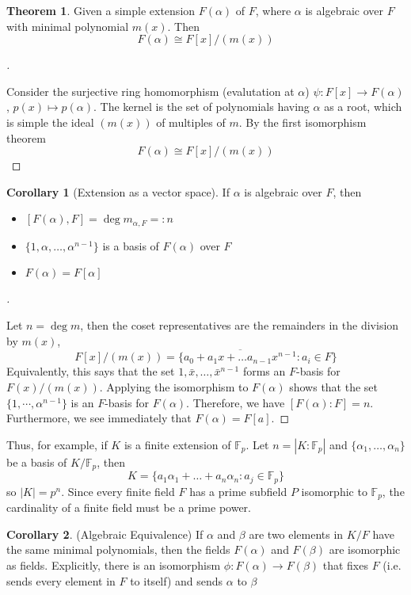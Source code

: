 \documentclass[12pt]{article}
\theoremstyle{definition}
\newtheorem{thm}{Theorem}
\newtheorem{cor}{Corollary}
\newenvironment{proofs}[1][\proofname]{%
  \begin{proof}[#1]$ $\par\nobreak\ignorespaces
}{%
  \end{proof}
}
\newcommand{\FF}{\mathbb F}
\begin{document}
\begin{thm}
	Given a simple extension $F(\alpha)$ of $F$, where $\alpha$ is algebraic over $F$ with minimal polynomial $m(x)$. Then
	\[F(\alpha)\cong F[x]/(m(x))\]
\end{thm}

\begin{proofs}
	Consider the surjective ring homomorphism (evalutation at $\alpha$) $\psi: F[x]\to F(\alpha)$, $p(x)\mapsto p(\alpha)$. The kernel is the set of polynomials having $\alpha$ as a root, which is simple the ideal $(m(x))$ of multiples of $m$. By the first isomorphism theorem
	\[F(\alpha)\cong F[x]/(m(x))\]
\end{proofs}

\begin{cor}[Extension as a vector space]
	If $\alpha$ is algebraic over $F$, then
	\begin{itemize}
		\item $[F(\alpha),F]=\deg m_{\alpha,F}=:n$
		\item $\{1,\alpha,\dots, \alpha^{n-1}\}$ is a basis of $F(\alpha)$ over $F$
		\item $F(\alpha)=F[\alpha]$
	\end{itemize}
\end{cor}

\begin{proofs}
	Let $n=\deg m$, then the coset representatives are the remainders in the division by $m(x)$,
	\[F[x]/(m(x))=\{\overline{a_0+a_1x+\dots a_{n-1}x^{n-1}}: a_i \in F\}\]
	Equivalently, this says that the set ${1,\bar{x},\dots,\bar{x}^{n-1}}$ forms an $F$-basis for $F(x)/(m(x))$. Applying the isomorphism to $F(\alpha)$ shows that the set $\{1,\cdots,\alpha^{n-1}\}$ is an $F$-basis for $F(\alpha)$. Therefore, we have $[F(\alpha):F]=n$. Furthermore, we see immediately that $F(\alpha)=F[a]$.
\end{proofs}

Thus, for example, if $K$ is a finite extension of $\FF_p$. Let $n=|K:\FF_p|$ and $\{\alpha_1,\dots,\alpha_n\}$ be a basis of $K/\FF_p$, then
\[
	K=\{a_1\alpha_1+\dots+a_n \alpha_n : a_j \in \FF_p\}
\]
so $|K|=p^n$. Since every finite field $F$ has a prime subfield $P$ isomorphic to $\FF_p$, the cardinality of a finite field must be a prime power.


\begin{cor}(Algebraic Equivalence)
	If $\alpha$ and $\beta$ are two elements in $K/F$ have the same minimal polynomials, then the fields $F(\alpha)$ and $F(\beta)$ are isomorphic as fields. Explicitly, there is an isomorphism $\phi:F(\alpha)\to F(\beta)$ that fixes $F$ (i.e. sends every element in $F$ to itself) and sends $\alpha$ to $\beta$
\end{cor}
\end{document}

